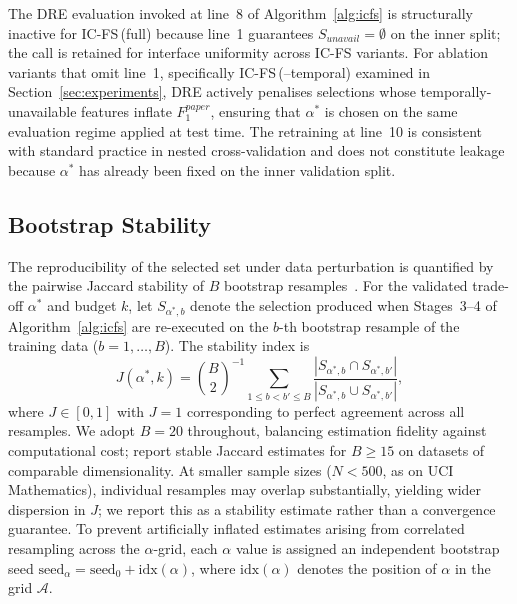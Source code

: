 \documentclass[a4paper,fleqn]{cas-sc}
\begin{document}
The DRE evaluation invoked at line~8 of Algorithm~\ref{alg:icfs} is structurally inactive for IC-FS\,(full) because line~1 guarantees $S_{unavail} = \emptyset$ on the inner split; the call is retained for interface uniformity across IC-FS variants. For ablation variants that omit line~1, specifically IC-FS\,(--temporal) examined in Section~\ref{sec:experiments}, DRE actively penalises selections whose temporally-unavailable features inflate $F_1^{paper}$, ensuring that $\alpha^*$ is chosen on the same evaluation regime applied at test time. The retraining at line~10 is consistent with standard practice in nested cross-validation and does not constitute leakage because $\alpha^*$ has already been fixed on the inner validation split.


\subsection{Bootstrap Stability}
\label{sec:icfs:stability}

The reproducibility of the selected set under data perturbation is quantified by the pairwise Jaccard stability of $B$ bootstrap resamples~\citep{meinshausen2010,pes2020}. For the validated trade-off $\alpha^*$ and budget $k$, let $S_{\alpha^*, b}$ denote the selection produced when Stages~3--4 of Algorithm~\ref{alg:icfs} are re-executed on the $b$-th bootstrap resample of the training data ($b = 1, \ldots, B$). The stability index is
\begin{equation}
    J(\alpha^*, k)
    = \binom{B}{2}^{-1}
        \sum_{1 \leq b < b' \leq B}
        \frac{|S_{\alpha^*, b} \cap S_{\alpha^*, b'}|}
             {|S_{\alpha^*, b} \cup S_{\alpha^*, b'}|},
    \label{eq:jaccard}
\end{equation}
where $J \in [0, 1]$ with $J = 1$ corresponding to perfect agreement across all resamples. We adopt $B = 20$ throughout, balancing estimation fidelity against computational cost; \citet{pes2020} report stable Jaccard estimates for $B \geq 15$ on datasets of comparable dimensionality. At smaller sample sizes ($N < 500$, as on UCI Mathematics), individual resamples may overlap substantially, yielding wider dispersion in $J$; we report this as a stability estimate rather than a convergence guarantee. To prevent artificially inflated estimates arising from correlated resampling across the $\alpha$-grid, each $\alpha$ value is assigned an independent bootstrap seed
$\mathrm{seed}_\alpha = \mathrm{seed}_0 + \mathrm{idx}(\alpha)$, where
$\mathrm{idx}(\alpha)$ denotes the position of $\alpha$ in the grid
$\mathcal{A}$.
\end{document}
